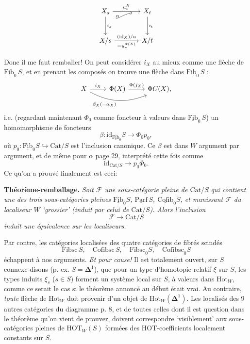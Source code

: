 \documentclass[11pt]{article}
\newcommand{\printedpage}[1]{\marginpar{\footnotesize p.~#1}}
\newcommand{\msp}[1]{\marginpar{\footnotesize [#1]}}
\newcommand{\uu}[1]{\underline{\mathrm{#1}}}
\begin{document}
\printedpage{19}

\[
\begin{tikzcd}[row sep=large, column sep=large]
X_s \arrow[r, "u_*^X"] \arrow[d, "i_s"] & X_t \arrow[d, "i_t"] \\
X/s \arrow[r, "(\mathrm{id}_X)/u", "= u_*^{\Phi(X)}"'] \arrow[ur, bend left=30, shorten <=28pt, shorten >=12pt, "\alpha"] & X/t
\end{tikzcd}
\]

\msp{page 31}
Donc il me faut remballer! On peut considérer $i_X$ au mieux comme une flèche de $\uu{Fib}_0\, S$, et en prenant les composés on trouve une flèche dans $\uu{Fib}_0\, S$ :
\[
\begin{tikzcd}
X \arrow[r, "i_X"] \arrow[rr, bend right=25, "\beta_X(=\alpha_X)"'] & \Phi(X) \arrow[r, "\Phi(j_X)"] & \Phi C(X),
\end{tikzcd}
\]
i.e. (regardant maintenant $\Phi_0$ comme foncteur à valeurs dans $\uu{Fib}_0\, S$) un homomorphisme de foncteurs
\[
\beta : \mathrm{id}_{\uu{Fib}_0} S \longrightarrow \Phi_0 p_0, %
\]
où $p_0 : \uu{Fib}_0 S \hookrightarrow \mathrm{Cat}/S$ est l'inclusion canonique. Ce $\beta$ est dans $W$ argument par argument, et de même pour $\alpha$ page 29, interprété cette fois comme
\[
\mathrm{id}_{\mathrm{Cat}/S} \longrightarrow p_0\Phi_0.
\]
Ce qu'on a prouvé finalement est ceci:

\textbf{Théorème-remballage.} \textit{Soit $\mathcal{F}$ une sous-catégorie pleine de $\mathrm{Cat}/S$ qui contient une des trois sous-catégories pleines $\uu{Fib}_0 S$, $\uu{Parf}\, S$, $\uu{Cofib}_0 S$, et munissant $\mathcal{F}$ du localiseur $W$ `grossier' (induit par celui de $\mathrm{Cat}/S$). Alors l'inclusion}
\[
\mathcal{F} \longrightarrow \mathrm{Cat}/S
\]
\textit{induit une équivalence sur les localiseurs.}

\msp{page 32}
Par contre, les catégories localisées des quatre catégories de fibrés scindés
\[
\uu{Fibsc}\, S, \quad \uu{Cofibsc}\, S, \quad \uu{Fibsc}_0 S, \quad \uu{Cofibsc}_0 S
\]
échappent à nos arguments. \textit{Et pour cause!} Il est totalement ouvert, sur $S$ connexe disons (p. ex. $S = \mathbf{\Delta}^1$), que pour un type d'homotopie relatif $\xi$ sur $S$, les types induits $\xi_s$ ($s \in S$) forment un système local sur $S$, à valeurs dans $\mathrm{Hot}_W$, comme ce serait le cas si le théorème annoncé au début était vrai. Au contraire, \textit{toute} flèche de $\mathrm{Hot}_W$ doit provenir d'un objet de $\mathrm{Hot}_W(\mathbf{\Delta}^1)$. Les localisés des 9 autres catégories du diagramme p. 8, et de toutes celles dont il est question dans le théorème qu'on vient de prouver, doivent correspondre `visiblement' aux sous-catégories pleines de $\mathrm{HOT}_W(S)$ formées des HOT-coefficients localement constants sur $S$.
\end{document}
